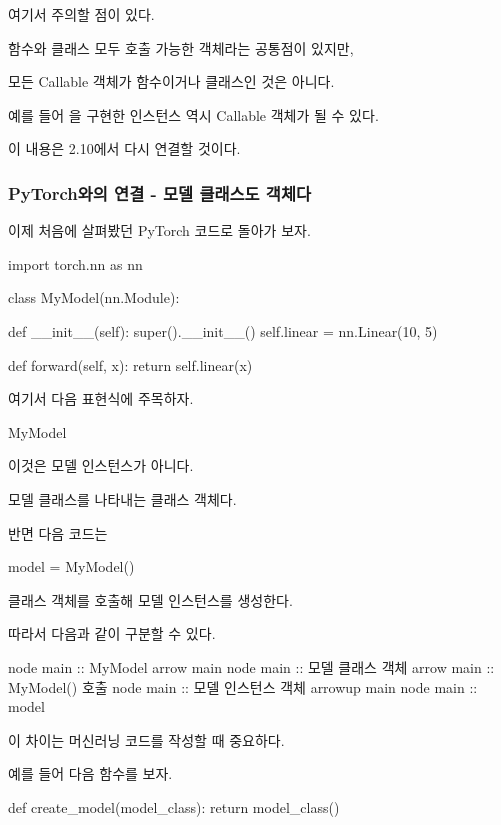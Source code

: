 여기서 주의할 점이 있다.

함수와 클래스 모두 호출 가능한 객체라는 공통점이 있지만,

모든 Callable 객체가 함수이거나 클래스인 것은 아니다.

예를 들어 을 구현한 인스턴스 역시 Callable 객체가 될 수 있다.

이 내용은 2.10에서 다시 연결할 것이다.

\subsubsection{PyTorch와의 연결 - 모델 클래스도 객체다}

이제 처음에 살펴봤던 PyTorch 코드로 돌아가 보자.

\begin{dhkcode}
import torch.nn as nn


class MyModel(nn.Module):

    def __init__(self):
        super().__init__()
        self.linear = nn.Linear(10, 5)

    def forward(self, x):
        return self.linear(x)
\end{dhkcode}

여기서 다음 표현식에 주목하자.

\begin{dhkcode}
MyModel
\end{dhkcode}

이것은 모델 인스턴스가 아니다.

모델 클래스를 나타내는 클래스 객체다.

반면 다음 코드는

\begin{dhkcode}
model = MyModel()
\end{dhkcode}

 클래스 객체를 호출해 모델 인스턴스를 생성한다.

따라서 다음과 같이 구분할 수 있다.

\begin{dhkbranch}[in=8]
node main :: MyModel
arrow main
node main :: 모델 클래스 객체
arrow main :: MyModel() 호출
node main :: 모델 인스턴스 객체
arrowup main
node main :: model
\end{dhkbranch}

이 차이는 머신러닝 코드를 작성할 때 중요하다.

예를 들어 다음 함수를 보자.

\begin{dhkcode}
def create_model(model_class):
    return model_class()
\end{dhkcode}

